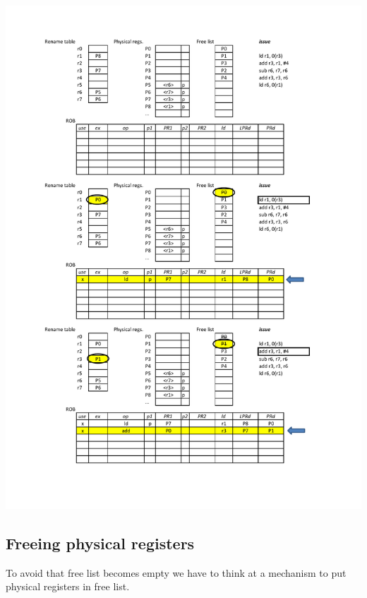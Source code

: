 \begin{center}
  \includegraphics[width=1.1\linewidth]{img/img3/rob_example}
\end{center}



\subsection{Freeing physical registers}

To avoid that free list becomes empty we have to think at a mechanism to put physical registers in free list.

